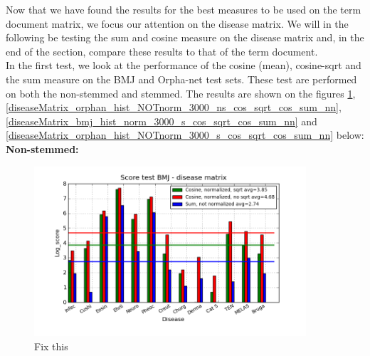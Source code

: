 Now that we have found the results for the best measures to be used on
the term document matrix, we focus our attention on the disease
matrix. We will in the following be testing the sum and cosine measure
on the disease matrix and, in the end of the section, compare these
results to that of the term document. \\

In the first test, we look at the performance of the cosine (mean),
cosine-sqrt and the sum measure on the BMJ and Orpha-net test
sets. These test are performed on both the non-stemmed and
stemmed. The results are shown on the figures
\ref{diseaseMatrix_bmj_hist_norm_3000_ns_cos_sqrt_cos_sum_nn},
\ref{diseaseMatrix_orphan_hist_NOTnorm_3000_ns_cos_sqrt_cos_sum_nn},
\ref{diseaseMatrix_bmj_hist_norm_3000_s_cos_sqrt_cos_sum_nn} and
\ref{diseaseMatrix_orphan_hist_NOTnorm_3000_s_cos_sqrt_cos_sum_nn}
below: \\

\textbf{Non-stemmed:}

\begin{figure}[H]
        \begin{center}
          \includegraphics[width=0.9\textwidth]{barcharts/diseaseMatrix_bmj_hist_norm_3000_ns_cos_sqrt_cos_sum_nn.png}
        \end{center}
        \caption{Fix this}
        \label{diseaseMatrix_bmj_hist_norm_3000_ns_cos_sqrt_cos_sum_nn}
\end{figure}

